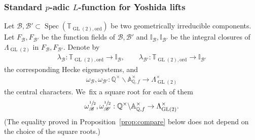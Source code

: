 \documentclass[10pt]{amsart}
\newcommand{\Lfunction}{$L$\nobreakdash-func\-tion\xspace}
\theoremstyle{plain}
\theoremstyle{remark}
\newcommand{\bA}{\mathbb{A}}
\newcommand{\bI}{\mathbb{I}}
\newcommand{\bQ}{\mathbb{Q}}
\newcommand{\bT}{\mathbb{T}}
\newcommand{\sB}{\mathscr{B}}
\DeclareMathOperator{\GL}{GL}
\newcommand{\ord}{\mathrm{ord}}
\DeclareMathOperator{\Spec}{Spec}
\begin{document}
\subsubsection{Standard \texorpdfstring{$p$-adic \protect\Lfunction}{pL} for Yoshida lifts}

Let $\sB,\sB'\subset \Spec(\bT_{\GL(2),\ord})$ be two geometrically irreducible components. Let $F_{\sB},F_{\sB'}$ be the function fields of $\sB,\sB'$ and $\bI_{\sB},\bI_{\sB'}$ be the integral closures of $\Lambda_{\GL(2)}$ in $F_{\sB},F_{\sB'}$. Denote by
\begin{align*}
\lambda_{\sB}:\bT_{\GL(2),\ord}\to \bI_{\sB},
\qquad\lambda_{\sB'}:\bT_{\GL(2),\ord}\to \bI_{\sB'}
\end{align*}
the corresponding Hecke eigensystems, and
\begin{align*}
\omega_{\sB},\omega_{\sB'}:\bQ^\times\backslash\bA^\times_{\bQ,f}\to \Lambda^\times_{\GL(2)}
\end{align*}
the central characters. We~fix a square root for each of them
\[
\omega^{\sfrac{1}{2}}_{\sB},\omega^{\sfrac{1}{2}}_{\sB'}:\bQ^\times\backslash\bA^\times_{\bQ,f}\to \Lambda^\times_{\GL(2)}.
\]
(The equality proved in Proposition~\ref{prop:compare} below does not depend on the choice of the square roots.)
\end{document}
